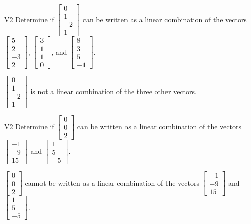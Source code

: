 \begin{problem}{V2}
Determine if \(\begin{bmatrix} 0 \\ 1 \\ -2 \\ 1 \end{bmatrix}\) can be written as a linear combination of the vectors \(\begin{bmatrix} 5 \\ 2 \\ -3 \\ 2 \end{bmatrix}\), \(\begin{bmatrix} 3 \\ 1 \\ 1 \\ 0 \end{bmatrix}\), and \(\begin{bmatrix} 8 \\ 3 \\ 5 \\ -1 \end{bmatrix}\).
\end{problem}
\begin{solution}
\(\begin{bmatrix} 0 \\ 1 \\ -2 \\ 1 \end{bmatrix}\) is not a linear combination of the three other vectors.
\end{solution}


\begin{problem}{V2}
Determine if  \(\begin{bmatrix} 0 \\ 0 \\ 2 \end{bmatrix}\) can be written as a linear combination of the vectors \(\begin{bmatrix} -1 \\ -9 \\ 15 \end{bmatrix}\) and \(\begin{bmatrix} 1 \\ 5 \\ -5 \end{bmatrix}\).
\end{problem}
\begin{solution}
\(\begin{bmatrix} 0 \\ 0 \\ 2 \end{bmatrix}\) cannot be written as a linear combination of the vectors \(\begin{bmatrix} -1 \\ -9 \\ 15 \end{bmatrix}\) and \(\begin{bmatrix} 1 \\ 5 \\ -5 \end{bmatrix}\).
\end{solution}


